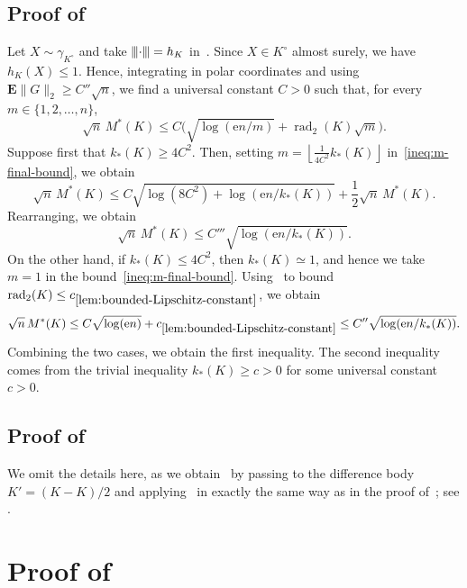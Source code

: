 \documentclass[11pt]{amsart}
\newcommand{\E}{\mathbf E}
\newcommand{\rad}{\operatorname{rad}_2}
\newcommand{\DualDvoretzky}{k_\ast}
\newcommand{\1}{\mathbf 1}
\newcommand{\vertiii}[1]{{\left\vert\kern-0.25ex\left\vert\kern-0.25ex\left\vert #1 
\right\vert\kern-0.25ex\right\vert\kern-0.25ex\right\vert}}
\newcommand{\gauge}[1]{\vertiii{#1}}
\newcommand{\e}{\mathrm{e}}
\newcommand{\floor}[1]{\left\lfloor #1 \right\rfloor}
\theoremstyle{plain}
\begin{document}
\subsection{Proof of~\texorpdfstring{}{the mean-width theorem}}

Let $X \sim \gamma_{K^\circ}$ and take $\gauge{\cdot} = h_K$ in~. Since $X \in K^\circ$ almost surely, we have $h_K(X)\leq 1$. Hence, integrating in polar coordinates and using $\E\|G\|_2 \geq C'' \sqrt{n}$, we find a universal constant $C > 0$ such that, for every $m \in \{1,2,\dots,n\}$,
\begin{equation}
\label{ineq:m-final-bound}
\sqrt{n} \, M^\ast(K) \leq 
C \Big(\sqrt{\log(\e n/m)}  + \rad(K) \sqrt{m} \Big).
\end{equation}
Suppose first that $\DualDvoretzky(K) \geq 4C^2$. 
Then, setting $m = \floor{\tfrac{1}{4C^2} \DualDvoretzky(K)}$ in~\eqref{ineq:m-final-bound}, we obtain
\[
\sqrt{n} \, M^\ast(K)  \leq C \sqrt{\log(8 C^2) + \log(\e n/\DualDvoretzky(K))} + 
\frac{1}{2} \sqrt{n} \, M^\ast(K). 
\]
Rearranging, we obtain 
\[
\sqrt{n} \, M^\ast(K)\leq C''' \sqrt{\log(\e n/\DualDvoretzky(K))}. 
\]
On the other hand, if $\DualDvoretzky(K) \leq 4C^2$, then $\DualDvoretzky(K) \simeq 1$, and hence we take $m = 1$ in the bound~\eqref{ineq:m-final-bound}. Using~ to bound $\rad(K) \leq c_{\ref{lem:bounded-Lipschitz-constant}}$, we obtain 
\[
\sqrt{n} \, M^\ast(K)
\leq C \sqrt{\log (\e n)} + c_{\ref{lem:bounded-Lipschitz-constant}} 
\leq C'' \sqrt{\log(\e n/\DualDvoretzky(K))}.
\]
Combining the two cases, we obtain the first inequality. The second inequality comes from the trivial inequality $\DualDvoretzky(K) \geq c > 0$ for some universal constant $c > 0$.


\subsection{Proof of~\texorpdfstring{}{the reverse Urysohn theorem}}

We omit the details here, as we obtain~ by passing to the difference body $K' = (K-K)/2$ and applying~ in exactly the same way as in the proof of~; see .



\section{Proof of~\texorpdfstring{}{the quermassintegral theorem}}
\end{document}

